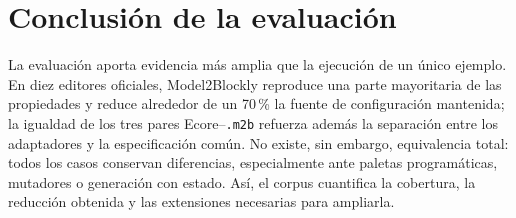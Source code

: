\section{Conclusión de la evaluación}
\label{sec:conclusion-evaluacion}

La evaluación aporta evidencia más amplia que la ejecución de un único
ejemplo. En diez editores oficiales, Model2Blockly reproduce una parte
mayoritaria de las propiedades y reduce alrededor de un 70\,\% la fuente de
configuración mantenida; la igualdad de los tres pares Ecore--\texttt{.m2b}
refuerza además la separación entre los adaptadores y la especificación común.
No existe, sin embargo, equivalencia total: todos los casos conservan
diferencias, especialmente ante paletas programáticas, mutadores o generación
con estado. Así, el corpus cuantifica la cobertura, la reducción obtenida y las
extensiones necesarias para ampliarla.
